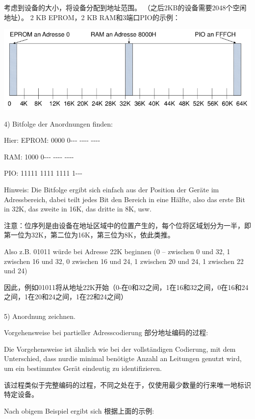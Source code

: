 \documentclass[fleqn]{article}
\begin{document}
考虑到设备的大小，将设备分配到地址范围。 （之后2KB的设备需要2048个空闲地址）。 2 KB EPROM，2 KB RAM和3端口PIO的示例：

\begin{center}
    \includegraphics[scale=0.5]{17.png}
\end{center}

4) Bitfolge der Anordnungen finden:

\indent\indent Hier: EPROM: 0000 0-{}-{}- -{}-{}-{}- -{}-{}-{}-

\indent\indent\indent RAM:  1000 0-{}-{}- -{}-{}-{}- -{}-{}-{}-

\indent\indent\indent PIO:  11111 1111 1111 1-{}-{}-

Hinweis: Die Bitfolge ergibt sich einfach aus der Position der Geräte im Adressbereich, dabei teilt jedes Bit den Bereich in eine Hälfte, also das erste Bit in 32K, das zweite in 16K, das dritte in 8K, usw.

注意：位序列是由设备在地址区域中的位置产生的，每个位将区域划分为一半，即第一位为32K，第二位为16K，第三位为8K，依此类推。

Also z.B. 01011 würde bei Adresse 22K beginnen (0 – zwischen 0 und 32, 1 zwischen 16 und 32, 0 zwischen 16 und 24, 1 zwischen 20 und 24, 1 zwischen 22 und 24)

因此，例如01011将从地址22K开始（0-在0和32之间，1在16和32之间，0在16和24之间，1在20和24之间，1在22和24之间）
\\
\\
5) Anordnung zeichnen.

Vorgehensweise bei partieller Adresscodierung 部分地址编码的过程:

Die Vorgehensweise ist ähnlich wie bei der vollständigen Codierung, mit dem Unterschied, dass nurdie minimal benötigte Anzahl an Leitungen genutzt wird, um ein bestimmtes Gerät eindeutig zu identifizieren.

该过程类似于完整编码的过程，不同之处在于，仅使用最少数量的行来唯一地标识特定设备。

Nach obigem Beispiel ergibt sich 根据上面的示例:
\end{document}
